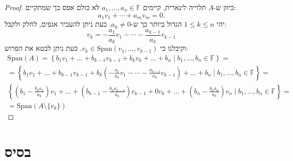 \documentclass{tstextbook}
\begin{document}
\begin{proof}
כיוון ש-\(A\) תלוייה לינארית, קיימים \(a_{1},\dots,a_{n}\in \mathbb{F}\) לא כולם אפס כך שמתקיים:
$$a_{1}v_{1}+\cdots+a_{m}v_{m}=0.$$
יהי \(1\leq k\leq n\) הגדול ביותר כך ש-\(a_{k}\neq 0\). כעת ניתן להעביר אגפים, לחלק ולקבל:
$$v_{k}=-{\frac{a_{1}}{a_{k}}}v_{1}-\cdots-{\frac{a_{k-1}}{a_{k}}}v_{k-1}$$
וקיבלנו כי \(v_{k}\in \mathrm{Span}\left( v_{1},\dots ,v_{k-1} \right)\). כעת ניתן לבטא את הפרוש:
\begin{gather*}\mathrm{Span}(A)=\left\{  b_{1}v_{1}+\dots+b_{k-1}v_{k-1} +b_{k}v_{k}+\dots+b_{n}\mid b_{1},\dots,b_{n}\in \mathbb{F}   \right\} = \\=\left\{  b_{1}v_{1}+\dots+b_{k-1}v_{k-1} +b_{k}\left( -{\frac{a_{1}}{a_{k}}}v_{1}-\cdots-{\frac{a_{k-1}}{a_{k}}}v_{k-1} \right)+\dots+b_{n}\mid b_{1},\dots,b_{n}\in \mathbb{F}   \right\}= \\\left\{  \left( b_{1}-\frac{b_{k}a_{1}}{a_{k}} \right)v_{1}+\dots+\left( b_{k-1}-\frac{b_{k}a_{k-1}}{a_{k}} \right)v_{k-1}+0v_{k}+\dots+\left( b_{n}-\frac{b_{k}a_{n}}{a_{k}} \right)v_{n}\mid b_{1},\dots,b_{n}\in \mathbb{F}     \right\}= \\=\mathrm{Span}\left( A \setminus  \{ v_{k} \} \right)
\end{gather*}

\end{proof}
\section{בסיס}
\end{document}
